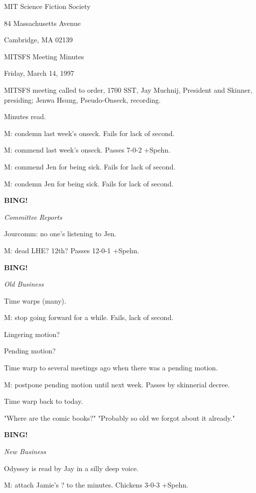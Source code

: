 \documentclass[12pt]{article}
\newcommand{\bing}{{\bf BING!} }
\newcommand{\goto}[1]{\bing \vskip 12pt \centerline{{\em{#1}}}}
\begin{document}
\begin{center}

MIT Science Fiction Society 

84 Massachusetts Avenue

Cambridge, MA 02139

\vspace{12pt}

MITSFS Meeting Minutes 

Friday, March 14, 1997

\end{center}
 
\vspace{18pt}

\setlength{\parskip}{6pt}

\noindent
MITSFS meeting called to order, 1700 SST,
Jay Muchnij, President and Skinner, presiding; Jenwa Hsung, Pseudo-Onseck, recording.

Minutes read.

M: condemn last week's onseck. Fails for lack of second.

M: commend last week's onseck. Passes 7-0-2 +Spehn.

M: commend Jen for being sick. Fails for lack of second.

M: condemn Jen for being sick. Fails for lack of second.

\goto{Committee Reports}

Jourcomm: no one's listening to Jen.

M: dead LHE? 12th? Passes 12-0-1 +Spehn.

\goto{Old Business}

Time warps (many).

M: stop going forward for a while. Fails, lack of second.

Lingering motion?

Pending motion?

Time warp to several meetings ago when there was a pending motion.

M: postpone pending motion until next week. Passes by skinnerial decree.

Time warp back to today.

"Where are the comic books?" "Probably so old we forgot about it already."

\goto{New Business}

Odyssey is read by Jay in a silly deep voice.

M: attach Jamie's ? to the minutes. Chickens 3-0-3 +Spehn.
\end{document}
